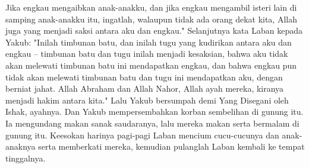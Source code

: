 \begin{biblechapter}
\verse Jika engkau mengaibkan anak-anakku, dan jika engkau mengambil isteri lain di samping anak-anakku itu, ingatlah, walaupun tidak ada orang dekat kita, Allah juga yang menjadi saksi antara aku dan engkau."
\verse Selanjutnya kata Laban kepada Yakub: "Inilah timbunan batu, dan inilah tugu yang kudirikan antara aku dan engkau --
\verse timbunan batu dan tugu inilah menjadi kesaksian, bahwa aku tidak akan melewati timbunan batu ini mendapatkan engkau, dan bahwa engkau pun tidak akan melewati timbunan batu dan tugu ini mendapatkan aku, dengan berniat jahat.
\verse Allah Abraham dan Allah Nahor, Allah ayah mereka, kiranya menjadi hakim antara kita." Lalu Yakub bersumpah demi Yang Disegani oleh Ishak, ayahnya.
\verse Dan Yakub mempersembahkan korban sembelihan di gunung itu. Ia mengundang makan sanak saudaranya, lalu mereka makan serta bermalam di gunung itu.
\verse Keesokan harinya pagi-pagi Laban mencium cucu-cucunya dan anak-anaknya serta memberkati mereka, kemudian pulanglah Laban kembali ke tempat tinggalnya.
\end{biblechapter}

